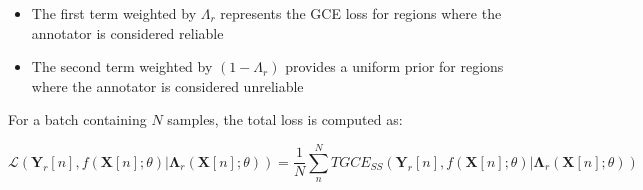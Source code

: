 \begin{itemize}
  \item The first term weighted by $\Lambda_r$ represents the GCE
    loss for regions where the annotator is considered reliable
  \item The second term weighted by $(1-\Lambda_r)$ provides a
    uniform prior for regions where the annotator is considered unreliable
\end{itemize}

For a batch containing $N$ samples, the total loss is computed as:

\begin{equation}
  \mathscr{L}\left(\mathbf{Y}_r[n],f(\mathbf X[n];\theta) |
  \mathbf{\Lambda}_r (\mathbf X[n];\theta)\right)  = \frac{1}{N}
  \sum_{n}^N TGCE_{SS}(\mathbf{Y}_r[n],f(\mathbf X[n];\theta) |
  \mathbf{\Lambda}_r (\mathbf X[n];\theta))
\end{equation}
